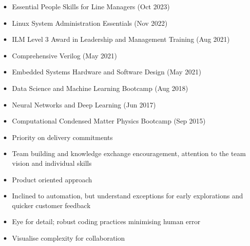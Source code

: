 \documentclass[10pt,a4paper,ragged2e,withhyper]{altacv}
\begin{document}
\begin{paracol}{2}
\begin{itemize}
    \item Essential People Skills for Line Managers (Oct 2023)

    \item Linux System Administration Essentials (Nov 2022)
    
    \item ILM Level 3 Award in Leadership and Management Training (Aug 2021)
    
    \item Comprehensive Verilog (May 2021)
    
    \item Embedded Systems Hardware and Software Design (May 2021)
    
    \item Data Science and Machine Learning Bootcamp (Aug 2018)
    
    \item Neural Networks and Deep Learning (Jun 2017)
    
    \item Computational Condensed Matter Physics Bootcamp (Sep 2015)
\end{itemize}



\begin{itemize}
    \item Priority on delivery commitments

    \item Team building and knowledge exchange encouragement,
    attention to the team vision and individual skills

    \item Product oriented approach

    \item Inclined to automation, but understand exceptions for early
    explorations and quicker customer feedback
    
    \item Eye for detail; robust coding practices minimising human error

    \item Visualise complexity for collaboration
\end{itemize}


\end{paracol}
\end{document}
